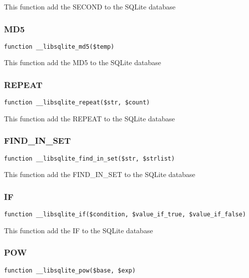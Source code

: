 \documentclass[a4paper]{article}
\begin{document}
This function add the SECOND to the SQLite database

\hypertarget{toc310}{}
\subsubsection{MD5}

\begin{lstlisting}
function __libsqlite_md5($temp)
\end{lstlisting}

This function add the MD5 to the SQLite database

\hypertarget{toc311}{}
\subsubsection{REPEAT}

\begin{lstlisting}
function __libsqlite_repeat($str, $count)
\end{lstlisting}

This function add the REPEAT to the SQLite database

\hypertarget{toc312}{}
\subsubsection{FIND\_IN\_SET}

\begin{lstlisting}
function __libsqlite_find_in_set($str, $strlist)
\end{lstlisting}

This function add the FIND\_IN\_SET to the SQLite database

\hypertarget{toc313}{}
\subsubsection{IF}

\begin{lstlisting}
function __libsqlite_if($condition, $value_if_true, $value_if_false)
\end{lstlisting}

This function add the IF to the SQLite database

\hypertarget{toc314}{}
\subsubsection{POW}

\begin{lstlisting}
function __libsqlite_pow($base, $exp)
\end{lstlisting}
\end{document}
